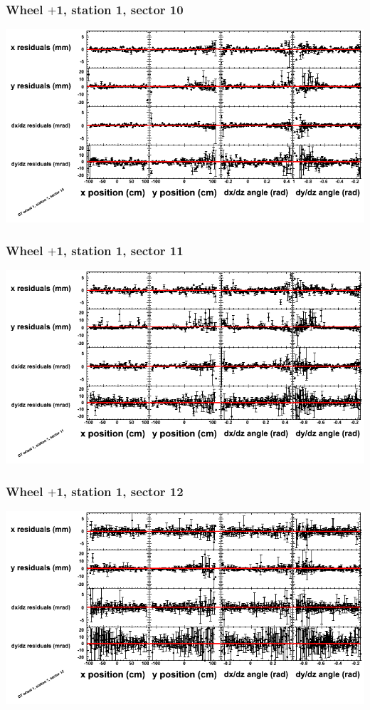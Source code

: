 \documentclass[compress]{beamer}
\begin{document}
\begin{frame}
\frametitle{Wheel $+$1, station 1, sector 10}
\includegraphics[width=\linewidth]{tmppoly_MBwhDst1sec10.png}
\end{frame}

\begin{frame}
\frametitle{Wheel $+$1, station 1, sector 11}
\includegraphics[width=\linewidth]{tmppoly_MBwhDst1sec11.png}
\end{frame}

\begin{frame}
\frametitle{Wheel $+$1, station 1, sector 12}
\includegraphics[width=\linewidth]{tmppoly_MBwhDst1sec12.png}
\end{frame}
\end{document}
